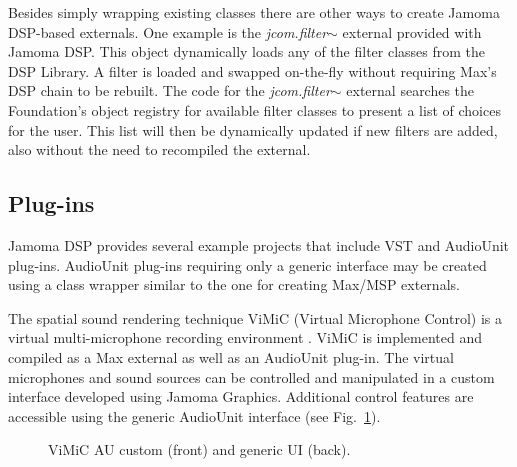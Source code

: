 \documentclass[twoside,10pt]{article}
\begin{document}
\noindent Besides simply wrapping existing classes there are other ways to create Jamoma DSP-based externals. One example is the \emph{\small{jcom.filter$\sim$}} external provided with Jamoma DSP.  This object dynamically loads any of the filter classes from the DSP Library. A filter is loaded and swapped on-the-fly without requiring Max's DSP chain to be rebuilt.  The code for the \emph{\small{jcom.filter$\sim$}} external searches the Foundation's object registry for available filter classes to present a list of choices for the user.  This list will then be dynamically updated if new filters are added, also without the need to recompiled the external.   


\subsection{Plug-ins}

Jamoma DSP provides several example projects that include VST and AudioUnit plug-ins.  AudioUnit plug-ins requiring only a generic interface may be created using a class wrapper similar to the one for creating Max/MSP externals.  

The spatial sound rendering technique ViMiC (Virtual Microphone Control) is a virtual multi-microphone recording environment \cite{CMJ08-VIMIC}.  ViMiC is implemented and compiled as a Max external as well as an AudioUnit plug-in. The virtual microphones and sound sources can be controlled and manipulated in a custom interface developed using Jamoma Graphics.  Additional control features are accessible using the generic AudioUnit interface (see Fig.~\ref{fig:vimic}).


\begin{figure}[hb]
\centerline{}
\caption{ViMiC AU custom (front) and generic UI (back).}
\label{fig:vimic}
\end{figure}
\end{document}
